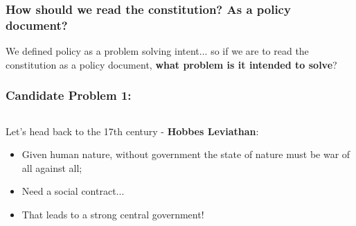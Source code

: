 \documentclass[aspectratio=169]{beamer}
\theoremstyle{principle}
\begin{document}
\begin{frame}
\frametitle{How should we read the constitution?  As a policy document?}
\begin{center}
\Large We defined policy as a problem solving intent... so if we are to read the constitution as a policy document, \textbf{what problem is it intended to solve}?
\end{center}
\end{frame}

\begin{frame}
\frametitle{Candidate Problem 1:}

\begin{columns}

\begin{column}{0.5\textwidth}
Let's head back to the 17th century - \textbf{Hobbes Leviathan}: 
\bigskip
\begin{itemize}
\item Given human nature, without government the state of nature must be war of all against all;
\bigskip
\item Need a social contract...
\bigskip
\item That leads to a strong central government!
\end{itemize}

\end{column}


\end{columns}
\end{frame}
\end{document}
